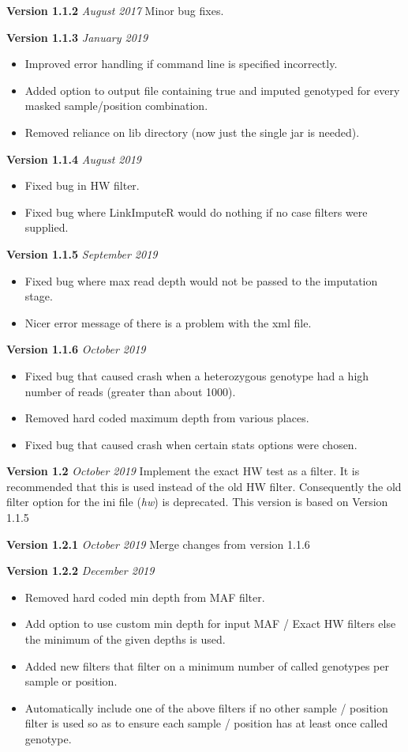 \documentclass[10pt]{report}
\begin{document}
\textbf{Version 1.1.2} \textit{August 2017} Minor bug fixes.

\textbf{Version 1.1.3} \textit{January 2019}
\begin{itemize}
    \item Improved error handling if command line is specified incorrectly.
    \item Added option to output file containing true and imputed genotyped for every masked sample/position combination.
    \item Removed reliance on lib directory (now just the single jar is needed).
\end{itemize}

\textbf{Version 1.1.4} \textit{August 2019}
\begin{itemize}
    \item Fixed bug in HW filter.
    \item Fixed bug where LinkImputeR would do nothing if no case filters were supplied.
\end{itemize}

\textbf{Version 1.1.5} \textit{September 2019}
\begin{itemize}
    \item Fixed bug where max read depth would not be passed to the imputation stage.
    \item Nicer error message of there is a problem with the xml file.
\end{itemize}

\textbf{Version 1.1.6} \textit{October 2019}
\begin{itemize}
    \item Fixed bug that caused crash when a heterozygous genotype had a high number of reads (greater than about 1000).
    \item Removed hard coded maximum depth from various places.
    \item Fixed bug that caused crash when certain stats options were chosen.
\end{itemize}

\textbf{Version 1.2} \textit{October 2019} Implement the exact HW test as a filter.  It is recommended that this is used instead of the old HW filter.  Consequently the old filter option for the ini file (\emph{hw}) is deprecated.  This version is based on Version 1.1.5

\textbf{Version 1.2.1} \textit{October 2019} Merge changes from version 1.1.6

\textbf{Version 1.2.2} \textit{December 2019}
\begin{itemize}
    \item Removed hard coded min depth from MAF filter.
    \item Add option to use custom min depth for input MAF / Exact HW filters else the minimum of the given depths is used.
    \item Added new filters that filter on a minimum number of called genotypes per sample or position.
    \item Automatically include one of the above filters if no other sample / position filter is used so as to ensure each sample / position has at least once called genotype.
\end{itemize}
\end{document}
